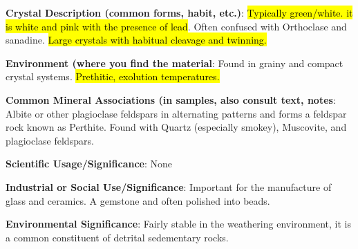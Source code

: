 \documentclass[10pt]{article}
\begin{document}
\begin{framed}
  \textbf{Crystal Description (common forms, habit, etc.)}: \hl{Typically green/white. it is white and pink with the presence of lead}. Often confused with Orthoclase and sanadine. \hl{Large crystals with habitual cleavage and twinning.}
\end{framed}

\begin{framed}
  \textbf{Environment (where you find the material}: Found in grainy and compact crystal systems. \hl{Prethitic, exolution temperatures.}
\end{framed}

\begin{framed}
  \textbf{Common Mineral Associations (in samples, also consult text, notes}: Albite or other plagioclase feldspars in alternating patterns and forms a feldspar rock known as Perthite. Found with Quartz (especially smokey), Muscovite, and plagioclase feldspars.
\end{framed}

\begin{framed}
  \textbf{Scientific Usage/Significance}: None
\end{framed}

\begin{framed}
  \textbf{Industrial or Social Use/Significance}: Important for the manufacture of glass and ceramics. A gemstone and often polished into beads.
\end{framed}

\begin{framed}
  \textbf{Environmental Significance}: Fairly stable in the weathering environment, it is a common constituent of detrital sedementary rocks.
\end{framed}

\end{document}
